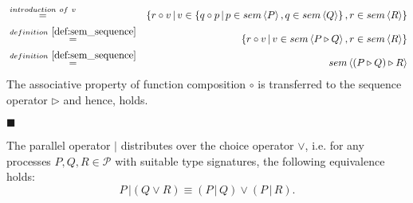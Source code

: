 \begin{myproof}
\begin{eqnarray*}
  & \overset{introduction \ of \ v}{=} & \left\{ r \circ v \,|\, v \in \left\{ q \circ p \,|\, p \in sem \left\langle P \right\rangle, q \in sem \left\langle Q \right\rangle \right\}, r \in sem \left\langle R \right\rangle \right\} \\
  & \overset{\defref{def:sem_sequence}}{=} & \left\{ r \circ v \,|\, v \in sem \left\langle P \triangleright Q \right\rangle, r \in sem \left\langle R \right\rangle \right\} \\
  & \overset{\defref{def:sem_sequence}}{=} & sem \left\langle \left( P \triangleright Q \right) \triangleright R \right\rangle
\end{eqnarray*}
The associative property of function composition $\circ$ is transferred to the sequence operator $\triangleright$ and hence,  holds.

\hfill$\blacksquare$
\end{myproof}

\begin{theorem}
\label{thm:distributivity_parallel_choice}
The parallel operator $|$ distributes over the choice operator $\vee$, i.e. for any processes $P, Q, R \in \mathcal{P}$ with suitable type signatures, the following equivalence holds:
\begin{equation*}
  P \,| \left( Q \vee R \right) \equiv \left( P \,|\, Q \right) \vee \left( P \,|\, R \right).
\end{equation*}
\end{theorem}

